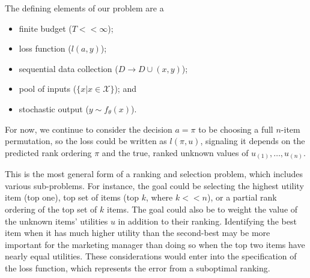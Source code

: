\documentclass[a4paper,11pt]{article}
\newcommand{\numitems}{n}
\newcommand{\numtopset}{k}
\begin{document}
The defining elements of our problem are a
\begin{itemize}
	\item finite budget ($T << \infty$);
	\item loss function ($l(a,y)$);
	\item sequential data collection ($D \to D \cup (x,y)$);
	\item pool of inputs ($\{ x | x \in \mathcal{X} \}$); and
	\item stochastic output ($y \sim f_{\theta}(x)$).
\end{itemize}
For now, we continue to consider the decision $a=\pi$ to be choosing a full $\numitems$-item permutation, so the loss could be written as $l(\pi,u)$, signaling it depends on the predicted rank ordering $\pi$ and the true, ranked unknown values of $u_{(1)},\ldots,u_{(\numitems)}$. 

This is the most general form of a ranking and selection problem, which includes various sub-problems. For instance, the goal could be selecting the highest utility item (top one), top set of items (top $\numtopset$, where $\numtopset << \numitems$), or a partial rank ordering of the top set of $\numtopset$ items. The goal could also be to weight the value of the unknown items' utilities $u$ in addition to their ranking. Identifying the best item when it has much higher utility than the second-best may be more important for the marketing manager than doing so when the top two items have nearly equal utilities. These considerations would enter into the specification of the loss function, which represents the error from a suboptimal ranking.



\end{document}

